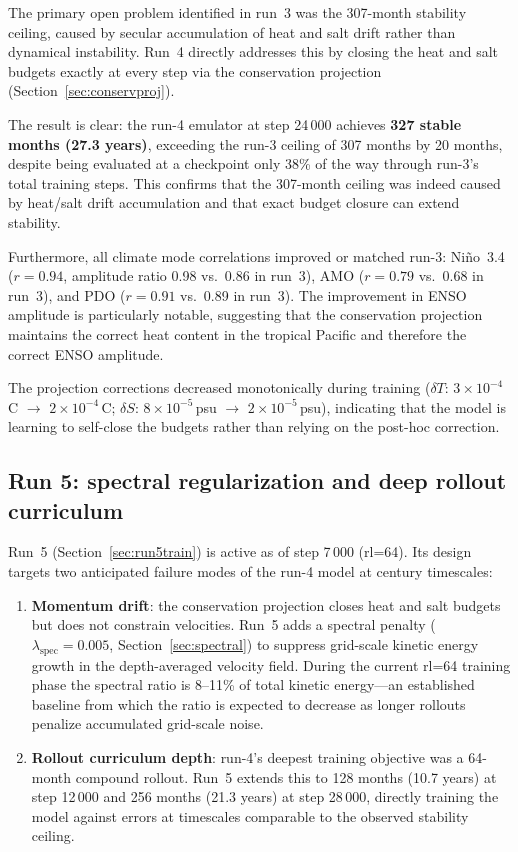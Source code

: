 \documentclass[11pt]{article}
\begin{document}
The primary open problem identified in run~3 was the 307-month stability ceiling,
caused by secular accumulation of heat and salt drift rather than dynamical instability.
Run~4 directly addresses this by closing the heat and salt budgets exactly at every
step via the conservation projection (Section~\ref{sec:conservproj}).

The result is clear: the run-4 emulator at step 24\,000 achieves \textbf{327 stable
months (27.3 years)}, exceeding the run-3 ceiling of 307 months by 20 months, despite
being evaluated at a checkpoint only 38\% of the way through run-3's total training
steps. This confirms that the 307-month ceiling was indeed caused by heat/salt drift
accumulation and that exact budget closure can extend stability.

Furthermore, all climate mode correlations improved or matched run-3:
Ni\~no~3.4 ($r=0.94$, amplitude ratio 0.98 vs.\ 0.86 in run~3),
AMO ($r=0.79$ vs.\ 0.68 in run~3), and PDO ($r=0.91$ vs.\ 0.89 in run~3).
The improvement in ENSO amplitude is particularly notable, suggesting that the
conservation projection maintains the correct heat content in the tropical Pacific
and therefore the correct ENSO amplitude.

The projection corrections decreased monotonically during training ($\delta T$:
$3\times10^{-4}$\,\textdegree C $\to$ $2\times10^{-4}$\,\textdegree C;
$\delta S$: $8\times10^{-5}$\,psu $\to$ $2\times10^{-5}$\,psu), indicating
that the model is learning to self-close the budgets rather than relying on the
post-hoc correction.

\subsection{Run 5: spectral regularization and deep rollout curriculum}

Run~5 (Section~\ref{sec:run5train}) is active as of step 7\,000 (rl=64).
Its design targets two anticipated failure modes of the run-4 model at
century timescales:

\begin{enumerate}[itemsep=2pt]
  \item \textbf{Momentum drift}: the conservation projection closes heat and salt
    budgets but does not constrain velocities. Run~5 adds a spectral penalty
    ($\lambda_\text{spec}=0.005$, Section~\ref{sec:spectral}) to suppress
    grid-scale kinetic energy growth in the depth-averaged velocity field.
    During the current rl=64 training phase the spectral ratio is 8--11\% of
    total kinetic energy---an established baseline from which the ratio is
    expected to decrease as longer rollouts penalize accumulated grid-scale noise.

  \item \textbf{Rollout curriculum depth}: run-4's deepest training objective was
    a 64-month compound rollout. Run~5 extends this to 128 months (10.7 years)
    at step 12\,000 and 256 months (21.3 years) at step 28\,000, directly
    training the model against errors at timescales comparable to the
    observed stability ceiling.
\end{enumerate}
\end{document}
